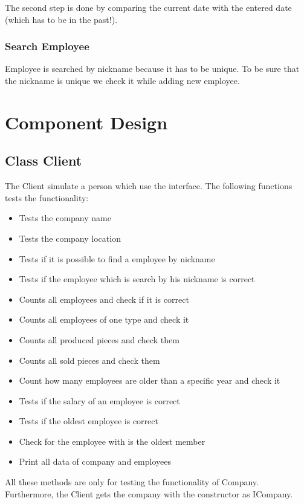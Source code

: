 The second step is done by comparing the current date with the entered date (which has to be in the past!).
\subsubsection{Search Employee}
Employee is searched by nickname because it has to be unique. To be sure that the nickname is unique we check it while adding new employee.

\section{Component Design}
\subsection{Class Client}
The Client simulate a person which use the interface.
The following functions tests the functionality:
\begin{itemize}
	\item Tests the company name
	\item Tests the company location
	\item Tests if it is possible to find a employee by nickname
	\item Tests if the employee which is search by his nickname is correct
	\item Counts all employees and check if it is correct
	\item Counts all employees of one type and check it
	\item Counts all produced pieces and check them
	\item Counts all sold pieces and check them
	\item Count how many employees are older than a specific year and check it
	\item Tests if the salary of an employee is correct
	\item Tests if the oldest employee is correct
	\item Check for the employee with is the oldest member
	\item Print all data of company and employees
\end{itemize}

All these methods are only for testing the functionality of Company. Furthermore, the Client gets the company with the constructor as ICompany.

